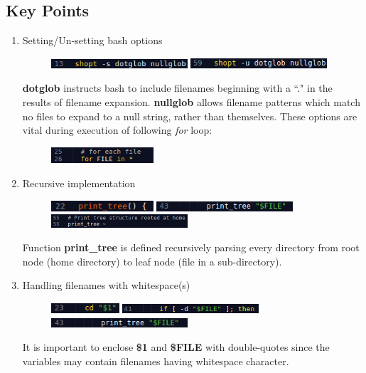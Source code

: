 \documentclass[12pt,a4paper]{article}
\begin{document}
\subsection{Key Points}
\begin{enumerate}
  \item Setting/Un-setting bash options
\begin{figure}[!h]
	\includegraphics[width=2in]{task01_1_1.png}
	\includegraphics[width=2in]{task01_1_2.png}
\end{figure}

\textbf{dotglob} instructs bash to include filenames beginning with a ``." in the results of filename expansion. \textbf{nullglob} allows filename patterns which match no files to expand to a null string, rather than themselves. These options are vital during execution of following \textit{for} loop:
\begin{figure}[!h]
	\includegraphics[width=1.5in]{task01_1_3.png}
\end{figure}

  \item Recursive implementation
\begin{figure}[!htb]
	\includegraphics[width=1.5in]{task01_2_1.png}
	\includegraphics[width=2in]{task01_2_2.png}
	\includegraphics[width=2in]{task01_2_3.png}
\end{figure}

Function \textbf{print\_tree} is defined recursively parsing every directory from root node (home directory) to leaf node (file in a sub-directory).

  \item Handling filenames with whitespace(s)
\begin{figure}[!h]
	\includegraphics[width=1in]{task01_3_1.png}
	\includegraphics[width=2in]{task01_3_2.png}
	\includegraphics[width=2in]{task01_3_3.png}
\end{figure}

It is important to enclose \textbf{\$1} and \textbf{\$FILE} with double-quotes since the variables may contain filenames having whitespace character.
\end{enumerate}
\end{document}
